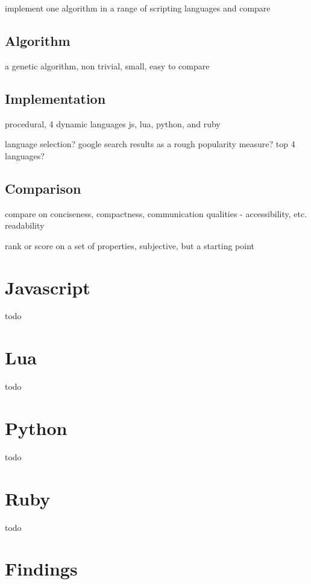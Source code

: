 \documentclass[a4paper, 11pt]{article}
\begin{document}
implement one algorithm in a range of scripting languages and compare

% 
% 
\subsection{Algorithm}
a genetic algorithm, non trivial, small, easy to compare

% 
% 
\subsection{Implementation}
procedural, 4 dynamic languages
js, lua, python, and ruby


language selection? google search results as a rough popularity measure?
top 4 languages?


% 
% 
\subsection{Comparison}
compare on conciseness, compactness, communication qualities - accessibility, etc. readability

rank or score on a set of properties, subjective, but a starting point


% 
% 
\section{Javascript}
\label{sec:javascript}
todo


% 
% 
\section{Lua}
\label{sec:lua}
todo


% 
% 
\section{Python}
\label{sec:python}
todo


% 
% 
\section{Ruby}
\label{sec:ruby}
todo



% 
% 
\section{Findings}
\label{sec:conclusions}






\end{document}
